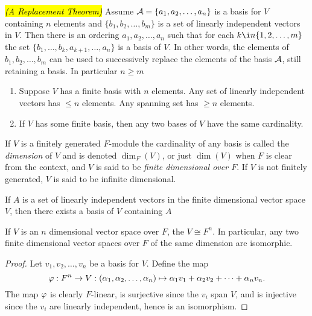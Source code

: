 \nl

\begin{thm}\hl{\textit{(A Replacement Theorem)}}
Assume $\mathcal{A} = \{a_1,a_2,\ldots,a_n\}$ is a basis for $V$ containing $n$ elements and $\{b_1,b_2,\ldots, b_m\}$ is a set of linearly independent vectors in $V$. Then there is an ordering $a_1,a_2,\ldots,a_n$ such that for each $k\i n\{1,2,\ldots,m\}$ the set $\{b_1,\ldots, b_k, a_{k+1}, \ldots, a_n\}$ is a basis of $V$. In other words, the elements of $b_1,b_2,\ldots, b_m$ can be used to successively replace the elements of the basis $\mathcal{A}$, still retaining a basis. In particular $n\geq m$
\end{thm}

\nl

\begin{cor}\nl
\begin{enumerate}
\item Suppose $V$ has a finite basis with $n$ elements. Any set of linearly independent vectors has $\leq n$ elements. Any spanning set has $\geq n$ elements.
\item If $V$ has some finite basis, then any two bases of $V$ have the same cardinality.
\end{enumerate}
\end{cor}

\nl

\begin{defn}
If $V$ is a finitely generated $F$-module the cardinality of any basis is called the \textit{dimension} of $V$ and is denoted $\dim_F(V)$, or just $\dim(V)$ when $F$ is clear from the context, and $V$ is said to be \textit{finite dimensional over $F$}. If $V$ is not finitely generated, $V$ is said to be infinite dimensional.
\end{defn}

\nl

\begin{cor}
If $A$ is a set of linearly independent vectors in the finite dimensional vector space $V$, then there exists a basis of $V$ containing $A$
\end{cor}

\nl

\begin{thm}
If $V$ is an $n$ dimensional vector space over $F$, the $V\cong F^n$. In particular, any two finite dimensional vector spaces over $F$ of the same dimension are isomorphic.
\end{thm}

\begin{proof}
Let $v_1,v_2,\ldots,v_n$ be a basis for $V$. Define the map 
\[\varphi:F^n\rightarrow V:(\alpha_1,\alpha_2,\ldots,\alpha_n)\mapsto\alpha_1v_1 + \alpha_2v_2+\cdots+\alpha_n v_n.\]
The map $\varphi$ is clearly $F$-linear, is surjective since the $v_i$ span $V$, and is injective since the $v_i$ are linearly independent, hence is an isomorphism.
\end{proof}

